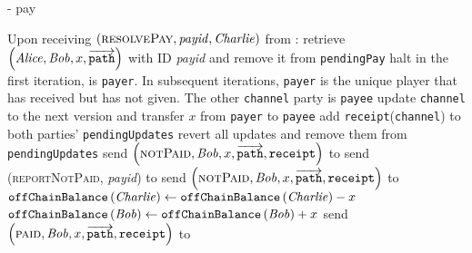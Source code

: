 \begin{systembox}{\fpaynet - pay}
\begin{algorithmic}[1]
    \State Upon receiving $\left(\textsc{resolvePay}, \mathit{payid},
    \mathit{Charlie}\right)$ from \simulator:
    \Indent
      \State retrieve $\left(\mathit{Alice}, \mathit{Bob}, x,
      \overrightarrow{\mathtt{path}}\right)$ with ID \textit{payid} and remove
      it from \texttt{pendingPay}
        \State halt
      \EndIf
        \State in the first iteration, \charlie{} is \texttt{payer}. In
        subsequent iterations, \texttt{payer} is the unique player that has
        received but has not given. The other \texttt{channel} party is
        \texttt{payee}
          \State update \texttt{channel} to the next version and transfer $x$
          from \texttt{payer} to \texttt{payee}
          \State add \texttt{receipt}(\texttt{channel}) to both parties'
          \texttt{pendingUpdates}
        \Else
          \State revert all updates and remove them from
          \texttt{pendingUpdates}
          \State {}
            \State send $\left(\textsc{notPaid}, \mathit{Bob}, x,
            \overrightarrow{\mathtt{path}}, \mathtt{receipt}\right)$ to \alice
          \Else
            \State send (\textsc{reportNotPaid}, \textit{payid}) to
            \simulator {}
              \State send $\left(\textsc{notPaid}, \mathit{Bob}, x,
              \overrightarrow{\mathtt{path}}, \mathtt{receipt}\right)$ to
              \alice
            \EndIf
          \EndIf
          \State {}
        \EndIf
      \EndFor
      \State $\mathtt{offChainBalance}\left(\mathit{Charlie}\right) \gets
      \mathtt{offChainBalance}\left(\mathit{Charlie}\right) - x$
      \State $\mathtt{offChainBalance}\left(\mathit{Bob}\right) \gets
      \mathtt{offChainBalance}\left(\mathit{Bob}\right) + x$
      \If{\charlie{} = \alice}
        \State send $\left(\textsc{paid}, \mathit{Bob}, x,
        \overrightarrow{\mathtt{path}}, \mathtt{receipt}\right)$ to \alice
      \EndIf
    \EndIndent
    \State
  \end{algorithmic}
\end{systembox}

